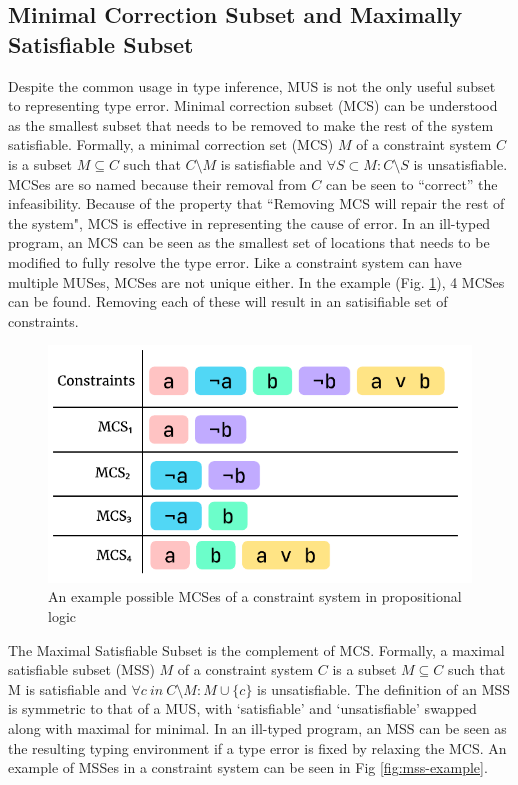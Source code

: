 \subsection{Minimal Correction Subset and Maximally Satisfiable Subset}

Despite the common usage in type inference, MUS is not the only useful subset to representing type error. Minimal correction subset (MCS) can be understood as the smallest subset that needs to be removed to make the rest of the system satisfiable. Formally, a minimal correction set (MCS) $M$ of a constraint system $C$ is a subset $M \subseteq C$ such that $C \setminus M$ is satisfiable and $\forall{S} \subset M : C \setminus S$ is unsatisfiable. MCSes are so named because their removal from $C$ can be seen to “correct” the infeasibility. Because of the property that ``Removing MCS will repair the rest of the system", MCS is effective in representing the cause of error. In an ill-typed program, an MCS can be seen as the smallest set of locations that needs to be modified to fully resolve the type error.  Like a constraint system can have multiple MUSes, MCSes are not unique either. In the example (Fig. \ref{fig:mcs-example}), 4 MCSes can be found. Removing each of these will result in an satisifiable set of constraints. 

\begin{figure}[hbt]
  \includegraphics[width=0.8\linewidth]{MCS}
  \caption{
    \label{fig:mcs-example}
      An example possible MCSes of a constraint system in propositional logic}
\end{figure}

The Maximal Satisfiable Subset is the complement of MCS. Formally, a maximal satisfiable subset (MSS) $M$ of a constraint system $C$ is a subset $M \subseteq C$ such that M is satisfiable and $\forall{c}\ in\ C \setminus M:M\cup\{c\}$ is unsatisfiable. The definition of an MSS is symmetric to that of a MUS, with `satisfiable' and `unsatisfiable' swapped along with maximal for minimal. In an ill-typed program, an MSS can be seen as the resulting typing environment if a type error is fixed by relaxing the MCS. An example of MSSes in a constraint system can be seen in Fig \ref{fig:mss-example}.


